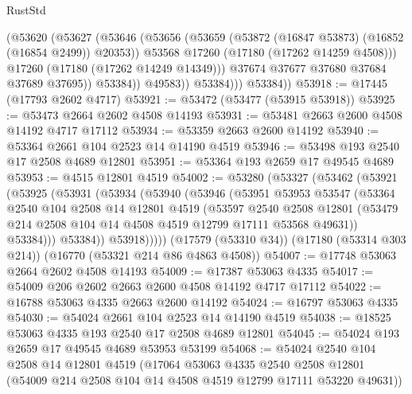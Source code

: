 \begin{lexlean}{RustStd}
\begin{coremodule}
                      (@53620
                        (@53627
                          (@53646
                            (@53656
                              (@53659 (@53872 (@16847 @53873) (@16852 (@16854 @2499)) @20353))
                              @53568
                              @17260
                              (@17180 (@17262 @14259 @4508)))
                            @17260
                            (@17180 (@17262 @14249 @14349)))
                          @37674
                          @37677
                          @37680
                          @37684
                          @37689
                          @37695))
                      @53384))
                  @49583))
              @53384)))
        @53384))
@53918 := @17445 (@17793 @2602 @4717)
@53921 := @53472 (@53477 (@53915 @53918))
@53925 := @53473 @2664 @2602 @4508 @14193
@53931 := @53481 @2663 @2600 @4508 @14192 @4717 @17112
@53934 := @53359 @2663 @2600 @14192
@53940 := @53364 @2661 @104 @2523 @14 @14190 @4519
@53946 := @53498 @193 @2540 @17 @2508 @4689 @12801
@53951 := @53364 @193 @2659 @17 @49545 @4689
@53953 := @4515 @12801 @4519
@54002 := @53280
    (@53327
      (@53462
        (@53921
          (@53925
            (@53931
              (@53934
                (@53940
                  (@53946
                    (@53951
                      @53953
                      @53547
                      (@53364
                        @2540
                        @104
                        @2508
                        @14
                        @12801
                        @4519
                        (@53597
                          @2540
                          @2508
                          @12801
                          (@53479 @214 @2508 @104 @14 @4508 @4519 @12799 @17111 @53568 @49631))
                        @53384)))
                  @53384))
              @53918)))))
    (@17579 (@53310 @34))
    (@17180 (@53314 @303 @214))
    (@16770 (@53321 @214 @86 @4863 @4508))
@54007 := @17748 @53063 @2664 @2602 @4508 @14193
@54009 := @17387 @53063 @4335
@54017 := @54009 @206 @2602 @2663 @2600 @4508 @14192 @4717 @17112
@54022 := @16788 @53063 @4335 @2663 @2600 @14192
@54024 := @16797 @53063 @4335
@54030 := @54024 @2661 @104 @2523 @14 @14190 @4519
@54038 := @18525 @53063 @4335 @193 @2540 @17 @2508 @4689 @12801
@54045 := @54024 @193 @2659 @17 @49545 @4689 @53953 @53199
@54068 := @54024
    @2540
    @104
    @2508
    @14
    @12801
    @4519
    (@17064
      @53063
      @4335
      @2540
      @2508
      @12801
      (@54009 @214 @2508 @104 @14 @4508 @4519 @12799 @17111 @53220 @49631))

\end{coremodule}
\end{lexlean}

